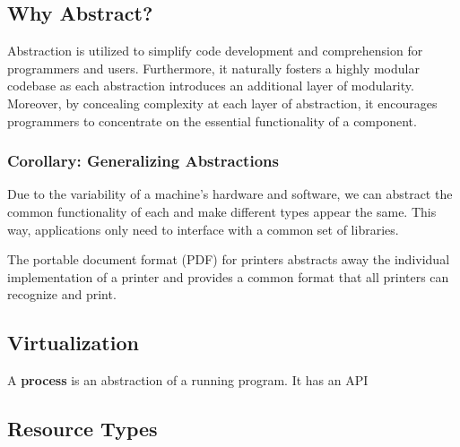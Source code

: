 \documentclass{article}
\begin{document}
\subsection{Why Abstract?}
Abstraction is utilized to simplify code development and comprehension for programmers and
users. Furthermore, it naturally fosters a highly modular codebase as each abstraction introduces an
additional layer of modularity. Moreover, by concealing complexity at each layer of abstraction, it
encourages programmers to concentrate on the essential functionality of a component. 


\subsubsection{Corollary: Generalizing Abstractions}
Due to the variability of a machine's hardware and software, we can abstract the common
functionality of each and make different types appear the same. This way, applications only need to
interface with a common set of libraries. 

\begin{tcolorbox}[colback=blue!5!white,colframe=black!75!blue,title=Example: Printing Press]
  The portable document format (PDF) for printers abstracts away the individual implementation of a
  printer and provides a common format that all printers can recognize and print.
\end{tcolorbox}

\begin{tcolorbox}[colback=red!5!white,colframe=red!75!red]
 \subsection{Virtualization}
\begin{tcolorbox}[colback=black!5!white,colframe=black!75!black,title=\textit{4) The Abstraction: The Process}]
  \begin{tcolorbox}[title=Definition: Process]
    A \textbf{process} is an abstraction of a running program. It has an API 
  \end{tcolorbox}
\end{tcolorbox}
\end{tcolorbox}



\subsection{Resource Types}
\end{document}

